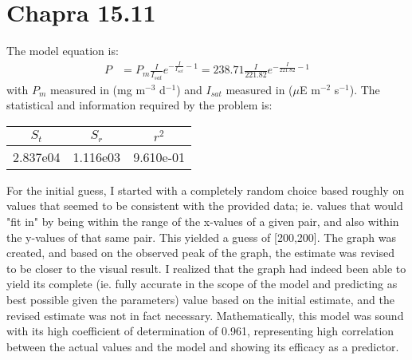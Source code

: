 \documentclass{article}
\begin{document}
\section{Chapra 15.11}
The model equation is:
\begin{align*} %
P&=P_m\frac{I}{I_{sat}}e^{-\frac{I}{I_{sat}}-1}=
238.71\frac{I}{221.82}e^{-\frac{I}{221.82}-1}
\end{align*}
with $P_m$ measured in (mg m$^{-3}$ d$^{-1}$) and $I_{sat}$ measured
in ($\mu$E m$^{-2}$ s$^{-1}$).
The statistical and information required by the problem is:
\begin{center}
\begin{tabular}{c|c|c}
$S_t$ & $S_r$ & $r^2$\\ \hline
2.837e04 & 1.116e03 & 9.610e-01 \\
\end{tabular}
\end{center}
For the initial guess, I started with a completely random choice based roughly on values that seemed to be consistent with the provided data; ie. values that would "fit in" by being within the range of the x-values of a given pair, and also within the y-values of that same pair. This yielded a guess of [200,200]. The graph was created, and based on the observed peak of the graph, the estimate was revised to be closer to the visual result. I realized that the graph had indeed been able to yield its complete (ie. fully accurate in the scope of the model and predicting as best possible given the parameters) value based on the initial estimate, and the revised estimate was not in fact necessary. Mathematically, this model was sound with its high coefficient of determination of 0.961, representing high correlation between the actual values and the model and showing its efficacy as a predictor.
 
\end{document}
